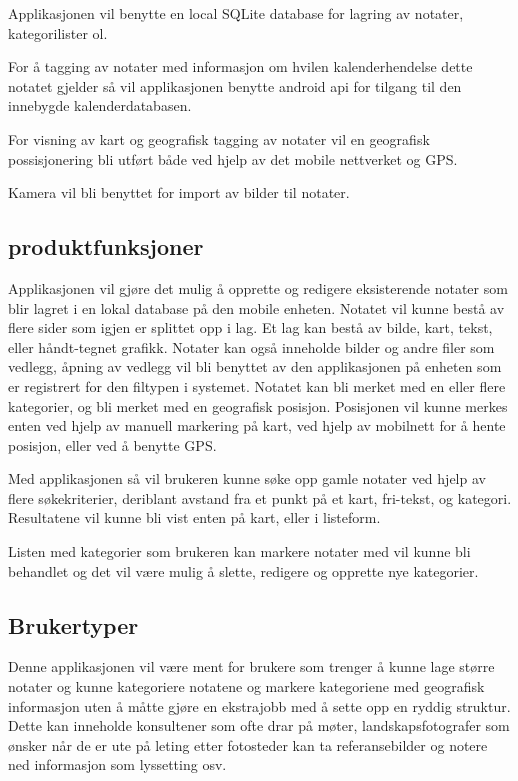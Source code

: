 \documentclass[a4paper, 12pt]{article}
\begin{document}
Applikasjonen vil benytte en local SQLite database for lagring av notater, kategorilister ol.

For å tagging av notater med informasjon om hvilen kalenderhendelse dette notatet gjelder så vil applikasjonen benytte android api for tilgang til den innebygde kalenderdatabasen.

For visning av kart og geografisk tagging av notater vil en geografisk possisjonering bli utført både ved hjelp av det mobile nettverket og GPS.

Kamera vil bli benyttet for import av bilder til notater.

\subsection{produktfunksjoner}
Applikasjonen vil gjøre det mulig å opprette og redigere eksisterende notater som blir lagret i en lokal database på den mobile enheten. Notatet vil kunne bestå av flere sider som igjen er splittet opp i lag. Et lag kan bestå av bilde, kart, tekst, eller håndt-tegnet grafikk. Notater kan også inneholde bilder og andre filer som vedlegg, åpning av vedlegg vil bli benyttet av den applikasjonen på enheten som er registrert for den filtypen i systemet. Notatet kan bli merket med en eller flere kategorier, og bli merket med en geografisk posisjon. Posisjonen vil kunne merkes enten ved hjelp av manuell markering på kart, ved hjelp av mobilnett for å hente posisjon, eller ved å benytte GPS.

Med applikasjonen så vil brukeren kunne søke opp gamle notater ved hjelp av flere søkekriterier, deriblant avstand fra et punkt på et kart, fri-tekst, og kategori. Resultatene vil kunne bli vist enten på kart, eller i listeform.

Listen med kategorier som brukeren kan markere notater med vil kunne bli behandlet og det vil være mulig å slette, redigere og opprette nye kategorier.

\subsection{Brukertyper}
Denne applikasjonen vil være ment for brukere som trenger å kunne lage større notater og kunne kategoriere notatene og markere kategoriene med geografisk informasjon uten å måtte gjøre en ekstrajobb med å sette opp en ryddig struktur. Dette kan inneholde konsultener som ofte drar på møter, landskapsfotografer som ønsker når de er ute på leting etter fotosteder kan ta referansebilder og notere ned informasjon som lyssetting osv.
\end{document}
